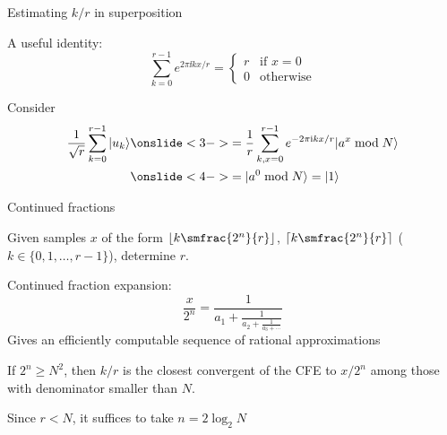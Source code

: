 \begin{frame}{Estimating $k/r$ in superposition}

A useful identity:
\[
  \sum_{k=0}^{r-1} e^{2\pi \ii k x/r} 
  = \begin{cases}r & \text{if $x=0$} \\
  0 & \text{otherwise}
  \end{cases}
\]

\pause

Consider
\begin{align*}
  \frac{1}{\sqrt r}\sum_{k=0}^{r-1} |u_k\>
  &\onslide<3->{= \frac{1}{r} \sum_{k,x=0}^{r-1} e^{-2\pi \ii k x/r} |a^x \bmod N\>} \\
  &\onslide<4->{= |a^0 \bmod N\> = |1\>}
\end{align*}


\end{frame}


\begin{frame}{Continued fractions}

\begin{problem}
Given samples $x$ of the form $\floor{k \smfrac{2^n}{r}}$, $\ceil{k \smfrac{2^n}{r}}$ ($k \in \{0,1,\ldots,r-1\}$), determine $r$.
\end{problem}

\pause
\medskip

Continued fraction expansion:
\[
  \frac{x}{2^n} = \frac{1}{a_1+\frac{1}{a_2+\frac{1}{a_3+\cdots}}}
\]
Gives an efficiently computable sequence of rational approximations

\pause
\medskip

\begin{theorem}
If $2^n \ge N^2$, then $k/r$ is the closest convergent of the CFE to $x/2^n$ among those with denominator smaller than $N$.
\end{theorem}

\pause
\medskip

Since $r < N$, it suffices to take $n=2\log_2 N$
\end{frame}

